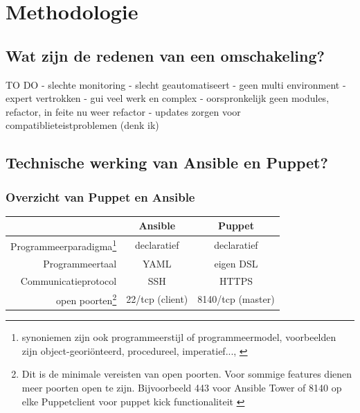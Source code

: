 
\chapter{Methodologie}
\label{ch:methodologie}


\section{Wat zijn de redenen van een omschakeling?}
\label{sec:methodologie-redenen-omschakeling}

TO DO
- slechte monitoring
- slecht geautomatiseert 
- geen multi environment
- expert vertrokken
- gui veel werk en complex
- oorspronkelijk geen modules, refactor, in feite nu weer refactor
- updates zorgen voor compatiblieteistproblemen (denk ik)

\section{Technische werking van Ansible en Puppet?}
\label{sec:methodologie-technische-verschillen}

\subsection{Overzicht van Puppet en Ansible}


\begin{tabular}{ r |c c }
& \textbf{Ansible} & \textbf{Puppet} \\
  \hline	  		
Programmeerparadigma\footnote{synoniemen zijn ook programmeerstijl of programmeermodel, voorbeelden zijn object-geori\"onteerd, procedureel, imperatief..., \autocite{journalofinformation} }  & declaratief & declaratief  \\
   \hline
 Programmeertaal & YAML & eigen DSL  \\
     \hline
   Communicatieprotocol & SSH & HTTPS \\
   \hline
   open poorten\footnote{Dit is de minimale vereisten van open poorten. Voor sommige features dienen meer poorten open te zijn. Bijvoorbeeld 443 voor Ansible Tower of 8140 op elke Puppetclient voor puppet kick functionaliteit \autocite{puppetkick} }  & 22/tcp (client) & 8140/tcp (master)\\
   
  

  \end{tabular}



